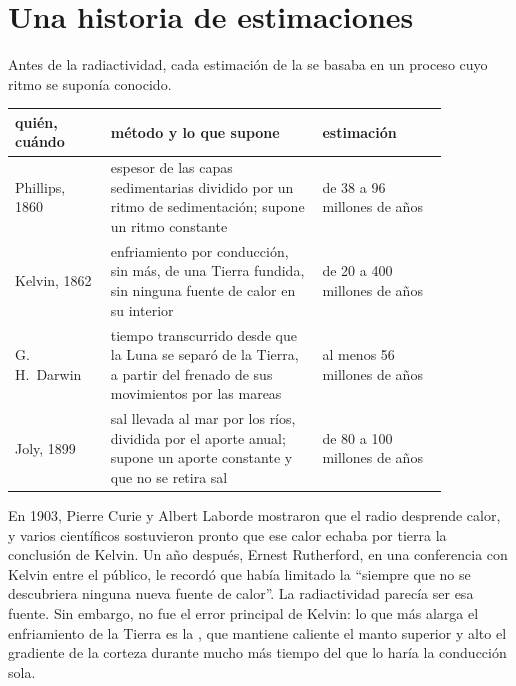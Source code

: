 \section{Una historia de estimaciones}

Antes de la radiactividad, cada estimación de la  se basaba
en un proceso cuyo ritmo se suponía conocido.

\begin{center}
\small
\begin{tabular}{|p{0.19\linewidth}|p{0.42\linewidth}|p{0.25\linewidth}|}
\hline
quién, cuándo & método y lo que supone & estimación \\
\hline
Phillips, 1860 & espesor de las capas sedimentarias dividido por un ritmo de sedimentación; supone un ritmo constante & de 38 a 96 millones de años \\
Kelvin, 1862 & enfriamiento por conducción, sin más, de una Tierra fundida, sin ninguna fuente de calor en su interior & de 20 a 400 millones de años \\
G.\,H.~Darwin & tiempo transcurrido desde que la Luna se separó de la Tierra, a partir del frenado de sus movimientos por las mareas & al menos 56 millones de años \\
Joly, 1899 & sal llevada al mar por los ríos, dividida por el aporte anual; supone un aporte constante y que no se retira sal & de 80 a 100 millones de años \\
\hline
\end{tabular}
\end{center}

\begin{history}
En 1903, Pierre Curie y Albert Laborde mostraron que el radio desprende
calor, y varios científicos sostuvieron pronto que ese calor echaba por
tierra la conclusión de Kelvin. Un año después, Ernest Rutherford, en una
conferencia con Kelvin entre el público, le recordó que había limitado la
 ``siempre que no se descubriera ninguna nueva fuente de
calor''. La radiactividad parecía ser esa fuente. Sin embargo, no fue el error
principal de Kelvin: lo que más alarga el enfriamiento de la Tierra es la
, que mantiene caliente el manto superior y alto el
gradiente de la corteza durante mucho más tiempo del que lo haría la
conducción sola.
\end{history}

